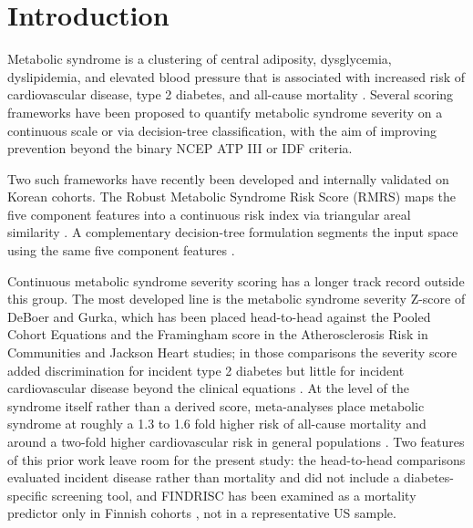 \documentclass[11pt]{article}
\begin{document}
\section*{Introduction}

Metabolic syndrome is a clustering of central adiposity, dysglycemia, dyslipidemia, and elevated blood pressure that is associated with increased risk of cardiovascular disease, type 2 diabetes, and all-cause mortality \citep{ncepatpiii, idfmets}. Several scoring frameworks have been proposed to quantify metabolic syndrome severity on a continuous scale or via decision-tree classification, with the aim of improving prevention beyond the binary NCEP ATP III or IDF criteria.

Two such frameworks have recently been developed and internally validated on Korean cohorts. The Robust Metabolic Syndrome Risk Score (RMRS) maps the five component features into a continuous risk index via triangular areal similarity \citep{shin2024rmrs}. A complementary decision-tree formulation segments the input space using the same five component features \citep{shin2023b9}.

Continuous metabolic syndrome severity scoring has a longer track record outside this group. The most developed line is the metabolic syndrome severity Z-score of DeBoer and Gurka, which has been placed head-to-head against the Pooled Cohort Equations and the Framingham score in the Atherosclerosis Risk in Communities and Jackson Heart studies; in those comparisons the severity score added discrimination for incident type 2 diabetes but little for incident cardiovascular disease beyond the clinical equations \citep{guo2018metsz, gurka2018metsz}. At the level of the syndrome itself rather than a derived score, meta-analyses place metabolic syndrome at roughly a 1.3 to 1.6 fold higher risk of all-cause mortality and around a two-fold higher cardiovascular risk in general populations \citep{galassi2006mets, mottillo2010mets}. Two features of this prior work leave room for the present study: the head-to-head comparisons evaluated incident disease rather than mortality and did not include a diabetes-specific screening tool, and FINDRISC has been examined as a mortality predictor only in Finnish cohorts \citep{silventoinen2005findrisc}, not in a representative US sample.
\end{document}
